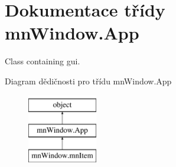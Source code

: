 \hypertarget{classmnWindow_1_1App}{\section{Dokumentace třídy mn\-Window.\-App}
\label{classmnWindow_1_1App}
}


Class containing gui.  


Diagram dědičnosti pro třídu mn\-Window.\-App\begin{figure}[H]
\begin{center}
\leavevmode
\includegraphics[height=3.000000cm]{d4/d8e/classmnWindow_1_1App}
\end{center}
\end{figure}
